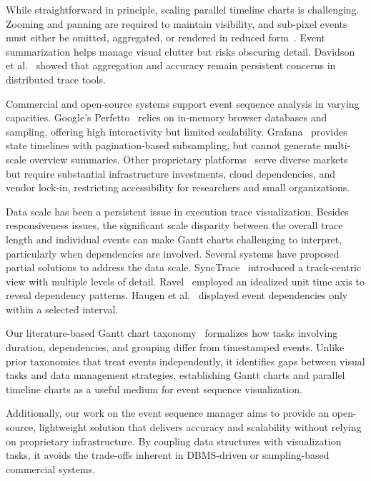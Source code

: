 \begin{refsection}
While straightforward in principle, scaling parallel timeline charts is challenging. Zooming and panning are required to maintain visibility, and sub-pixel events must either be omitted, aggregated, or rendered in reduced form~\cite{guo2021survey}. Event summarization helps manage visual clutter but risks obscuring detail. Davidson et al.~\cite{davidson2023qualitative} showed that aggregation and accuracy remain persistent concerns in distributed trace tools.

Commercial and open-source systems support event sequence analysis in varying capacities. Google’s Perfetto~\cite{Perfetto} relies on in-memory browser databases and sampling, offering high interactivity but limited scalability. Grafana~\cite{grafana} provides state timelines with pagination-based subsampling, but cannot generate multi-scale overview summaries. Other proprietary platforms~\cite{Tableau,Jaeger,Zipkin,AmazonXRay,Datadog,Lightstep,Flurry,NewRelic,Honeycomb,Elastic,powerbi} serve diverse markets but require substantial infrastructure investments, cloud dependencies, and vendor lock-in, restricting accessibility for researchers and small organizations.

Data scale has been a persistent issue in execution trace visualization. Besides responsiveness issues, the significant scale disparity between the overall trace length and individual events can make Gantt charts challenging to interpret, particularly when dependencies are involved. Several systems have proposed partial solutions to address the data scale. SyncTrace~\cite{karran2013synctrace} introduced a track-centric view with multiple levels of detail. Ravel~\cite{isaacs2014combing} employed an idealized unit time axis to reveal dependency patterns. Haugen et al.~\cite{haugen2015visualizing} displayed event dependencies only within a selected interval.

Our literature-based Gantt chart taxonomy~\cite{sakin2024gantttaxonomy} formalizes how tasks involving duration, dependencies, and grouping differ from timestamped events. Unlike prior taxonomies that treat events independently, it identifies gaps between visual tasks and data management strategies, establishing Gantt charts and parallel timeline charts as a useful medium for event sequence visualization.

Additionally, our work on the event sequence manager aims to provide an open-source, lightweight solution that delivers accuracy and scalability without relying on proprietary infrastructure. By coupling data structures with visualization tasks, it avoids the trade-offs inherent in DBMS-driven or sampling-based commercial systems.


\end{refsection}
